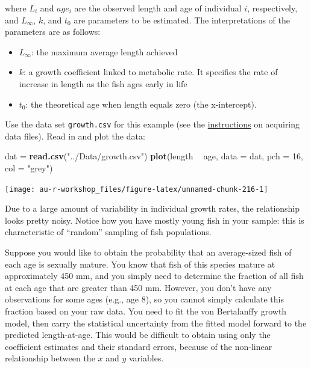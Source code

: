 \documentclass[]{book}
\newenvironment{Shaded}{\begin{snugshade}}{\end{snugshade}}
\newcommand{\KeywordTok}[1]{\textcolor[rgb]{0.13,0.29,0.53}{\textbf{#1}}}
\newcommand{\DataTypeTok}[1]{\textcolor[rgb]{0.13,0.29,0.53}{#1}}
\newcommand{\DecValTok}[1]{\textcolor[rgb]{0.00,0.00,0.81}{#1}}
\newcommand{\StringTok}[1]{\textcolor[rgb]{0.31,0.60,0.02}{#1}}
\newcommand{\OperatorTok}[1]{\textcolor[rgb]{0.81,0.36,0.00}{\textbf{#1}}}
\newcommand{\NormalTok}[1]{#1}
\providecommand{\tightlist}{%
  \setlength{\itemsep}{0pt}\setlength{\parskip}{0pt}}
\theoremstyle{definition}
\theoremstyle{definition}
\theoremstyle{definition}
\theoremstyle{remark}
\begin{document}
where \(L_i\) and \(age_i\) are the observed length and age of
individual \(i\), respectively, and \(L_{\infty}\), \(k\), and \(t_0\)
are parameters to be estimated. The interpretations of the parameters
are as follows:

\begin{itemize}
\tightlist
\item
  \(L_{\infty}\): the maximum average length achieved
\item
  \(k\): a growth coefficient linked to metabolic rate. It specifies the
  rate of increase in length as the fish ages early in life
\item
  \(t_0\): the theoretical age when length equals zero (the
  x-intercept).
\end{itemize}

Use the data set \texttt{growth.csv} for this example (see the
\protect\hyperlink{data-sets}{instructions} on acquiring data files).
Read in and plot the data:

\begin{Shaded}
\begin{Highlighting}[]
\NormalTok{dat =}\StringTok{ }\KeywordTok{read.csv}\NormalTok{(}\StringTok{"../Data/growth.csv"}\NormalTok{)}
\KeywordTok{plot}\NormalTok{(length }\OperatorTok{~}\StringTok{ }\NormalTok{age, }\DataTypeTok{data =}\NormalTok{ dat, }\DataTypeTok{pch =} \DecValTok{16}\NormalTok{, }\DataTypeTok{col =} \StringTok{"grey"}\NormalTok{)}
\end{Highlighting}
\end{Shaded}

\begin{center}\texttt{[image: au-r-workshop\_files/figure-latex/unnamed-chunk-216-1]} \end{center}

Due to a large amount of variability in individual growth rates, the
relationship looks pretty noisy. Notice how you have mostly young fish
in your sample: this is characteristic of ``random'' sampling of fish
populations.

Suppose you would like to obtain the probability that an average-sized
fish of each age is sexually mature. You know that fish of this species
mature at approximately 450 mm, and you simply need to determine the
fraction of all fish at each age that are greater than 450 mm. However,
you don't have any observations for some ages (e.g., age 8), so you
cannot simply calculate this fraction based on your raw data. You need
to fit the von Bertalanffy growth model, then carry the statistical
uncertainty from the fitted model forward to the predicted
length-at-age. This would be difficult to obtain using only the
coefficient estimates and their standard errors, because of the
non-linear relationship between the \(x\) and \(y\) variables.
\end{document}
